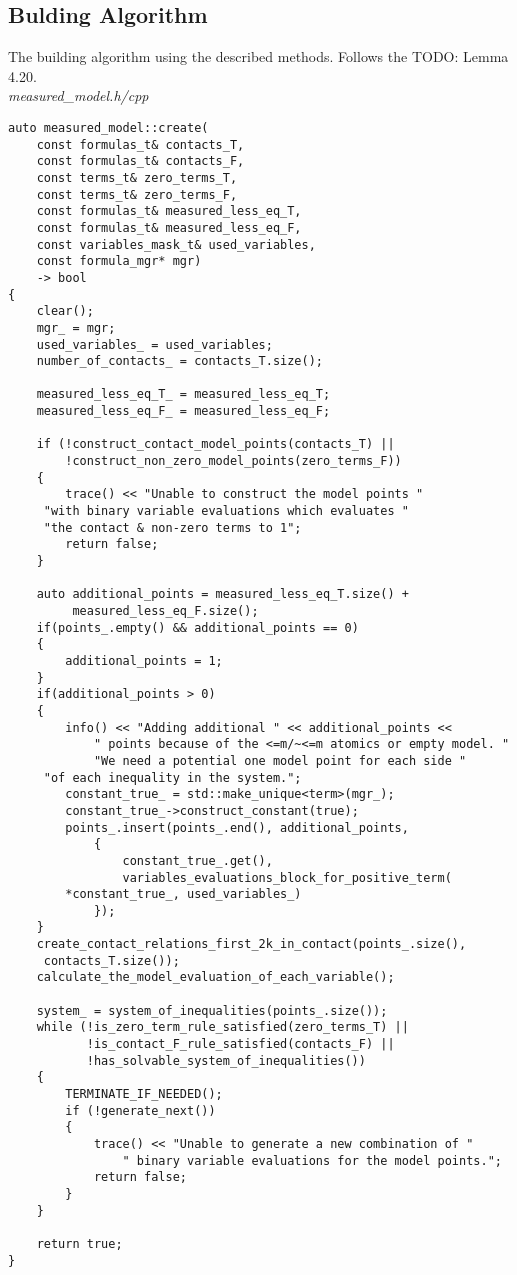 \documentclass{article}
\begin{document}
	\subsection{Bulding Algorithm}
		The building algorithm using the described methods. Follows the TODO: Lemma 4.20.
\\
\noindent
\textit{measured\_model.h/cpp}
\begin{lstlisting}
auto measured_model::create(
    const formulas_t& contacts_T,
    const formulas_t& contacts_F,
    const terms_t& zero_terms_T,
    const terms_t& zero_terms_F,
    const formulas_t& measured_less_eq_T,
    const formulas_t& measured_less_eq_F,
    const variables_mask_t& used_variables,
    const formula_mgr* mgr)
    -> bool
{
    clear();
    mgr_ = mgr;
    used_variables_ = used_variables;
    number_of_contacts_ = contacts_T.size();

    measured_less_eq_T_ = measured_less_eq_T;
    measured_less_eq_F_ = measured_less_eq_F;

    if (!construct_contact_model_points(contacts_T) ||
        !construct_non_zero_model_points(zero_terms_F))
    {
        trace() << "Unable to construct the model points "
	 "with binary variable evaluations which evaluates "
	 "the contact & non-zero terms to 1";
        return false;
    }

    auto additional_points = measured_less_eq_T.size() +
		 measured_less_eq_F.size();
    if(points_.empty() && additional_points == 0)
    {
        additional_points = 1;
    }
    if(additional_points > 0)
    {
        info() << "Adding additional " << additional_points <<
            " points because of the <=m/~<=m atomics or empty model. "
            "We need a potential one model point for each side "
	 "of each inequality in the system.";
        constant_true_ = std::make_unique<term>(mgr_);
        constant_true_->construct_constant(true);
        points_.insert(points_.end(), additional_points, 
            {
                constant_true_.get(),
                variables_evaluations_block_for_positive_term(
		*constant_true_, used_variables_)
            });
    }
    create_contact_relations_first_2k_in_contact(points_.size(),
	 contacts_T.size());
    calculate_the_model_evaluation_of_each_variable();

    system_ = system_of_inequalities(points_.size());
    while (!is_zero_term_rule_satisfied(zero_terms_T) ||
           !is_contact_F_rule_satisfied(contacts_F) ||
           !has_solvable_system_of_inequalities())
    {
        TERMINATE_IF_NEEDED();
        if (!generate_next())
        {
            trace() << "Unable to generate a new combination of " 
                " binary variable evaluations for the model points.";
            return false;
        }
    }

    return true;
}
\end{lstlisting}
\end{document}

